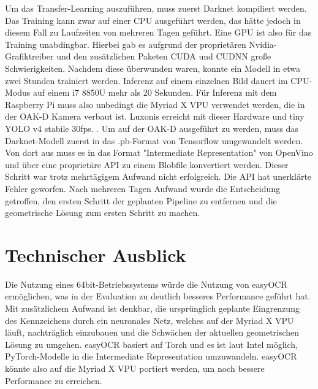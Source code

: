 Um das Transfer-Learning auszuführen, muss zuerst Darknet kompiliert werden. Das Training kann zwar auf einer CPU ausgeführt werden, das hätte jedoch in diesem Fall zu Laufzeiten von mehreren Tagen geführt. Eine GPU ist also für das Training unabdingbar.
Hierbei gab es aufgrund der proprietären Nvidia-Grafiktreiber und den zusätzlichen Paketen CUDA und CUDNN große Schwierigkeiten.
Nachdem diese überwunden waren, konnte ein Modell in etwa zwei Stunden trainiert werden. Inferenz auf einem einzelnen Bild dauert im CPU-Modus auf einem i7 8850U mehr als 20 Sekunden. Für Inferenz mit dem Raspberry Pi muss also unbedingt die Myriad X VPU verwendet werden, die in der OAK-D Kamera verbaut ist. Luxonis erreicht mit dieser Hardware und tiny YOLO v4 stabile 30fps. \autocite{Luxonis1}.
Um auf der OAK-D ausgeführt zu werden, muss das Darknet-Modell zuerst in das .pb-Format von Tensorflow umgewandelt werden.
Von dort aus muss es in das Format "Intermediate Representation" von OpenVino und über eine proprietäre API zu einem Blobfile konvertiert werden.
Dieser Schritt war trotz mehrtägigem Aufwand nicht erfolgreich. Die API hat unerklärte Fehler geworfen. Nach mehreren Tagen Aufwand wurde die Entscheidung getroffen, den ersten Schritt der geplanten Pipeline zu entfernen und die geometrische Lösung zum ersten Schritt zu machen.




\chapter{Technischer Ausblick}
Die Nutzung eines 64bit-Betriebssystems würde die Nutzung von easyOCR ermöglichen, was in der Evaluation zu deutlich besseres Performance geführt hat.
Mit zusätzlichem Aufwand ist denkbar, die ursprünglich geplante Eingrenzung des Kennzeichens durch ein neuronales Netz, welches auf der Myriad X VPU läuft, nachträglich einzubauen und die Schwächen der aktuellen geometrischen Lösung zu umgehen.
easyOCR basiert auf Torch und es ist laut Intel möglich, PyTorch-Modelle in die Intermediate Representation umzuwandeln.
easyOCR könnte also auf die Myriad X VPU portiert werden, um noch bessere Performance zu erreichen.

